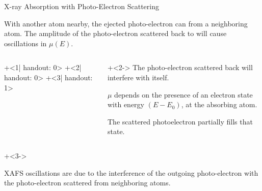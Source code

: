 \begin{slide}{X-ray Absorption with Photo-Electron Scattering}

  \vmm
  \begin{cenpage}{125mm}
    
  \Justify With another atom nearby, the ejected photo-electron can
  {} from a neighboring atom.  The amplitude of the
  photo-electron scattered back to {} will
  cause oscillations in $\mu(E)$.

    \vspace{3mm}

    \begin{columns}[T]
      \begin{column}{65mm}

        \begin{overprint}[65mm]
          \onslide+<1| handout: 0>  
          \onslide+<2| handout: 0> 
          \onslide+<3| handout: 1> 
        \end{overprint}
      \end{column}

      \begin{column}{55mm} \setlength{\baselineskip}{10pt}
          \justify

          {\onslide+<2->
            The photo-electron scattered back will interfere with itself.

            \vmm\vmm

            $\mu$ depends on the presence of an electron state with energy
            ${(E-E_0)}$, at the absorbing atom.

            \vmm\vmm

            The scattered photoelectron partially fills that state.
          }
      \end{column}
    \end{columns}

    \vspace{1mm}

    {\onslide+<3->

    \begin{center}
      \begin{postitbox}{105mm}\Justify
        XAFS oscillations are due to the interference of the
        outgoing  photo-electron with the
        photo-electron scattered from neighboring atoms.
        \end{postitbox}
      \end{center}
    }

  \end{cenpage}
  
\end{slide}
